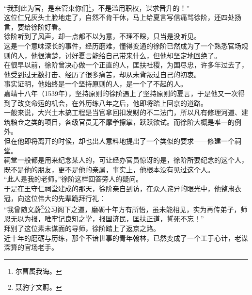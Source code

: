 \begin{multicols}{\theparacolNo}
“我到此为官，是来管束你们\footnote{尔曹属我诲。}，不是滥用职权，谋求晋升的！”\\

这位仁兄灰头土脸地走了，自然不肯干休，马上给夏言写信痛骂徐阶，还四处扬言，要给徐阶好看。\\

徐阶听到了风声，却一点都不以为意，不理不睬，只当是没听见。\\

这是一个意味深长的事件，经历磨难，懂得变通的徐阶已然成为了一个熟悉官场规则的人，他很清楚，讨好夏言能给自己带来什么，但他却坚定地回绝了。\\

在很早以前，徐阶曾决心做一个正直的人，匡扶社稷，为国尽忠，许多年过去了，他受到过无数打击、经历了很多痛苦，却从未背叛过自己的初衷。\\

事实证明，他始终是一个坚持原则的人，是一个了不起的人。\\

嘉靖十八年（1539年），坚持原则的徐阶遇上了坚持原则的夏言，于是他又一次得到了改变命运的机会，在外历练八年之后，他即将踏上回京的道路。\\

一般来说，大兴土木搞工程是当官拿回扣发财的不二法门，所以凡有修理河道、建筑粮仓之类的项目，各级官员无不摩拳擦掌，跃跃欲试。而徐阶大概是唯一的例外。\\

但在他即将离开的时候，却也出人意料地提出了一个类似的要求——修建一个祠堂。\\

祠堂一般都是用来纪念某人的，可让经办官员惊讶的是，徐阶所要纪念的这个人，既不是他的朋友，更不是他的亲属，事实上，他根本没有见过这个人。\\

“此人是我的老师。”徐阶这样回答旁人的疑问。\\

于是在王守仁祠堂建成的那天，徐阶亲自到访，在众人诧异的眼光中，他整肃衣冠，向这位伟大的先辈跪拜行礼：\\

“我曾随文蔚\footnote{聂豹字文蔚。}公习阁下之道，磨砺十年方有所悟，虽未能相见，实为再传弟子，师恩无以为报，唯牢记良知之学，报国济民，匡扶正道，誓死不忘！”\\

拜别了这位素未谋面的导师，徐阶踏上了返京之路。\\

近十年的磨砺与历练，那个不谙世事的青年翰林，已然变成了一个工于心计，老谋深算的官场老手。\\


\end{multicols}
